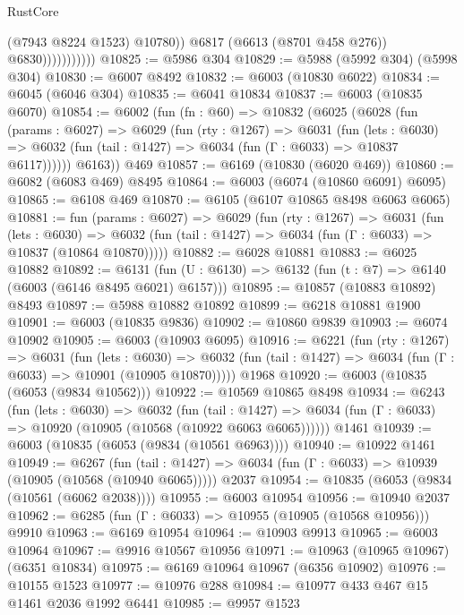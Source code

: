 \begin{lexlean}{RustCore}
\begin{coremodule}
{\begin{coremodule}
{{{{{{{{{{{{{{{{{{{{{{{{{{{{{{{{{{{{{{{{{{{{{{{                              (@7943 @8224 @1523)
                              @10780))
                          @6817
                          (@6613 (@8701 @458 @276))
                          @6830)))))))))))
@10825 := @5986 @304
@10829 := @5988 (@5992 @304) (@5998 @304)
@10830 := @6007 @8492
@10832 := @6003 (@10830 @6022)
@10834 := @6045 (@6046 @304)
@10835 := @6041 @10834
@10837 := @6003 (@10835 @6070)
@10854 := @6002
    (fun (fn : @60) =>
    @10832
      (@6025
        (@6028
          (fun (params : @6027) =>
          @6029
            (fun (rty : @1267) =>
            @6031
              (fun (lets : @6030) =>
              @6032 (fun (tail : @1427) => @6034 (fun (Γ : @6033) => @10837 @6117))))))
        @6163))
    @469
@10857 := @6169 (@10830 (@6020 @469))
@10860 := @6082 (@6083 @469) @8495
@10864 := @6003 (@6074 (@10860 @6091) @6095)
@10865 := @6108 @469
@10870 := @6105 (@6107 @10865 @8498 @6063 @6065)
@10881 := fun (params : @6027) =>
  @6029
    (fun (rty : @1267) =>
    @6031
      (fun (lets : @6030) =>
      @6032 (fun (tail : @1427) => @6034 (fun (Γ : @6033) => @10837 (@10864 @10870)))))
@10882 := @6028 @10881
@10883 := @6025 @10882
@10892 := @6131 (fun (U : @6130) => @6132 (fun (t : @7) => @6140 (@6003 (@6146 @8495 @6021) @6157)))
@10895 := @10857 (@10883 @10892) @8493
@10897 := @5988 @10882 @10892
@10899 := @6218 @10881 @1900
@10901 := @6003 (@10835 @9836)
@10902 := @10860 @9839
@10903 := @6074 @10902
@10905 := @6003 (@10903 @6095)
@10916 := @6221
    (fun (rty : @1267) =>
    @6031
      (fun (lets : @6030) =>
      @6032 (fun (tail : @1427) => @6034 (fun (Γ : @6033) => @10901 (@10905 @10870)))))
    @1968
@10920 := @6003 (@10835 (@6053 (@9834 @10562)))
@10922 := @10569 @10865 @8498
@10934 := @6243
    (fun (lets : @6030) =>
    @6032
      (fun (tail : @1427) =>
      @6034 (fun (Γ : @6033) => @10920 (@10905 (@10568 (@10922 @6063 @6065))))))
    @1461
@10939 := @6003 (@10835 (@6053 (@9834 (@10561 @6963))))
@10940 := @10922 @1461
@10949 := @6267
    (fun (tail : @1427) => @6034 (fun (Γ : @6033) => @10939 (@10905 (@10568 (@10940 @6065)))))
    @2037
@10954 := @10835 (@6053 (@9834 (@10561 (@6062 @2038))))
@10955 := @6003 @10954
@10956 := @10940 @2037
@10962 := @6285 (fun (Γ : @6033) => @10955 (@10905 (@10568 @10956))) @9910
@10963 := @6169 @10954
@10964 := @10903 @9913
@10965 := @6003 @10964
@10967 := @9916 @10567 @10956
@10971 := @10963 (@10965 @10967) (@6351 @10834)
@10975 := @6169 @10964 @10967 (@6356 @10902)
@10976 := @10155 @1523
@10977 := @10976 @288
@10984 := @10977 @433 @467 @15 @1461 @2036 @1992 @6441
@10985 := @9957 @1523
}}}}}}}}}}}}}}}}}}}}}}}}}}}}}}}}}}}}}}}}}}}}}}}
\end{coremodule}}
\end{coremodule}
\end{lexlean}
